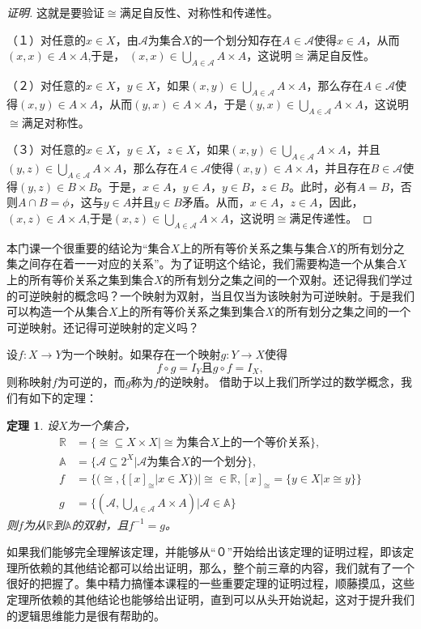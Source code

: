 \documentclass{article}
\newtheorem{Thm}{定理}
\begin{document}
\begin{CJK*}{UTF8}{gbsn}
  \begin{proof}[证明]
    这就是要验证$\cong$满足自反性、对称性和传递性。

    （１）对任意的$x\in X$，由$\mathscr{A}$为集合$X$的一个划分知存在$A\in \mathscr{A}$使得$x\in A$，从而$(x,x) \in A\times A$,于是， $(x,x)\in \bigcup_{A\in \mathscr{A}}A\times A$，这说明$\cong$满足自反性。

    （２）对任意的$x\in X$，$y\in X$，如果$(x,y)\in \bigcup_{A\in \mathscr{A}}A\times A$，那么存在$A\in \mathscr{A}$使得$(x,y)\in A\times A$，从而$(y,x)\in A\times A$，于是$(y,x)\in \bigcup_{A\in \mathscr{A}}A\times A$，这说明$\cong$满足对称性。

    （３）对任意的$x\in X$，$y\in X$，$z\in X$，如果$(x,y)\in \bigcup_{A\in \mathscr{A}}A\times A$，并且$(y,z)\in \bigcup_{A\in \mathscr{A}}A\times A$，那么存在$A\in \mathscr{A}$使得$(x,y)\in A\times A$，并且存在$B\in \mathscr{A}$使得$(y,z)\in B\times B$。于是，$x\in A$，$y\in A$，$y\in B$，$z\in B$。此时，必有$A=B$，否则$A\cap B=\phi$，这与$y\in A$并且$y\in B$矛盾。从而，$x\in A$，$z\in A$，因此，$(x,z)\in A\times A$,于是$(x,z)\in \bigcup_{A\in \mathscr{A}}A\times A$，这说明$\cong$满足传递性。
    
  \end{proof}

  本门课一个很重要的结论为“集合$X$上的所有等价关系之集与集合$X$的所有划分之集之间存在着一一对应的关系”。为了证明这个结论，我们需要构造一个从集合$X$上的所有等价关系之集到集合$X$的所有划分之集之间的一个双射。还记得我们学过的可逆映射的概念吗？一个映射为双射，当且仅当为该映射为可逆映射。于是我们可以构造一个从集合$X$上的所有等价关系之集到集合$X$的所有划分之集之间的一个可逆映射。还记得可逆映射的定义吗？

       设$f:X\to Y$为一个映射。如果存在一个映射$g:Y\to X$使得\[f\circ g = I_{Y} \text{且} g\circ f = I_{X},\]则称映射$f$为可逆的，而$g$称为$f$的逆映射。
借助于以上我们所学过的数学概念，我们有如下的定理：
 \begin{Thm}
    设$X$为一个集合，
    \begin{align*}
    \mathbb{R} &= \{\cong \subseteq X \times X | \cong\text{为集合}X\text{上的一个等价关系}\},\\
      \mathbb{A} &= \{\mathscr{A} \subseteq 2^X| \mathscr{A}\text{为集合}X\text{的一个划分}\},\\
      f &= \{(\cong, \{[x]_{\cong} | x \in X\})|\cong \in \mathbb{R}, [x]_{\cong}=\{y\in X | x \cong y\}\}\\
      g&=\{(\mathscr{A}, \bigcup_{A \in \mathscr{A}}A\times A)|\mathscr{A} \in \mathbb{A}\}
    \end{align*}
    则$f$为从$\mathbb{R}$到$\mathbb{A}$的双射，且$f^{-1}=g$。
  \end{Thm}
  如果我们能够完全理解该定理，并能够从“０”开始给出该定理的证明过程，即该定理所依赖的其他结论都可以给出证明，那么，整个前三章的内容，我们就有了一个很好的把握了。集中精力搞懂本课程的一些重要定理的证明过程，顺藤摸瓜，这些定理所依赖的其他结论也能够给出证明，直到可以从头开始说起，这对于提升我们的逻辑思维能力是很有帮助的。


\end{CJK*}
\end{document}
